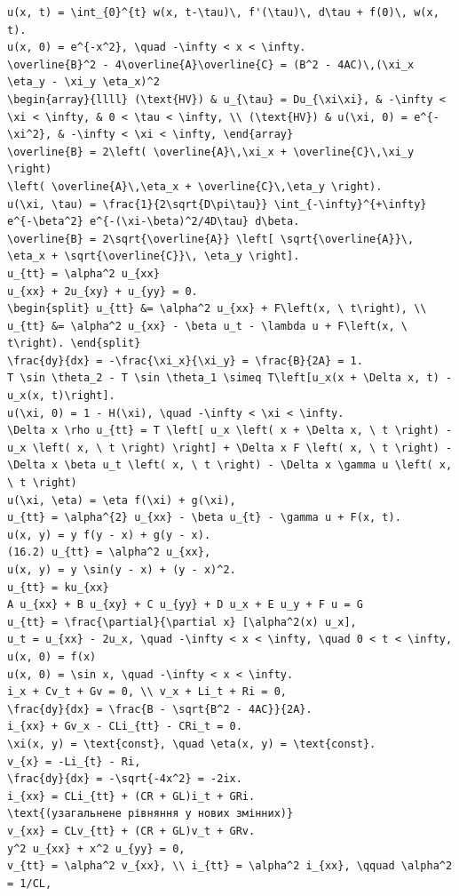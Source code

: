 \documentclass[
  ukrainian,
]{article}
\begin{document}
\begin{verbatim}
u(x, t) = \int_{0}^{t} w(x, t-\tau)\, f'(\tau)\, d\tau + f(0)\, w(x, t).
u(x, 0) = e^{-x^2}, \quad -\infty < x < \infty.
\overline{B}^2 - 4\overline{A}\overline{C} = (B^2 - 4AC)\,(\xi_x \eta_y - \xi_y \eta_x)^2
\begin{array}{llll} (\text{HV}) & u_{\tau} = Du_{\xi\xi}, & -\infty < \xi < \infty, & 0 < \tau < \infty, \\ (\text{HV}) & u(\xi, 0) = e^{-\xi^2}, & -\infty < \xi < \infty, \end{array}
\overline{B} = 2\left( \overline{A}\,\xi_x + \overline{C}\,\xi_y \right)
\left( \overline{A}\,\eta_x + \overline{C}\,\eta_y \right).
u(\xi, \tau) = \frac{1}{2\sqrt{D\pi\tau}} \int_{-\infty}^{+\infty} e^{-\beta^2} e^{-(\xi-\beta)^2/4D\tau} d\beta.
\overline{B} = 2\sqrt{\overline{A}} \left[ \sqrt{\overline{A}}\, \eta_x + \sqrt{\overline{C}}\, \eta_y \right].
u_{tt} = \alpha^2 u_{xx}
u_{xx} + 2u_{xy} + u_{yy} = 0.
\begin{split} u_{tt} &= \alpha^2 u_{xx} + F\left(x, \ t\right), \\ u_{tt} &= \alpha^2 u_{xx} - \beta u_t - \lambda u + F\left(x, \ t\right). \end{split}
\frac{dy}{dx} = -\frac{\xi_x}{\xi_y} = \frac{B}{2A} = 1.
T \sin \theta_2 - T \sin \theta_1 \simeq T\left[u_x(x + \Delta x, t) - u_x(x, t)\right].
u(\xi, 0) = 1 - H(\xi), \quad -\infty < \xi < \infty.
\Delta x \rho u_{tt} = T \left[ u_x \left( x + \Delta x, \ t \right) - u_x \left( x, \ t \right) \right] + \Delta x F \left( x, \ t \right) - \Delta x \beta u_t \left( x, \ t \right) - \Delta x \gamma u \left( x, \ t \right)
u(\xi, \eta) = \eta f(\xi) + g(\xi),
u_{tt} = \alpha^{2} u_{xx} - \beta u_{t} - \gamma u + F(x, t).
u(x, y) = y f(y - x) + g(y - x).
(16.2) u_{tt} = \alpha^2 u_{xx},
u(x, y) = y \sin(y - x) + (y - x)^2.
u_{tt} = ku_{xx}
A u_{xx} + B u_{xy} + C u_{yy} + D u_x + E u_y + F u = G
u_{tt} = \frac{\partial}{\partial x} [\alpha^2(x) u_x],
u_t = u_{xx} - 2u_x, \quad -\infty < x < \infty, \quad 0 < t < \infty,
u(x, 0) = f(x)
u(x, 0) = \sin x, \quad -\infty < x < \infty.
i_x + Cv_t + Gv = 0, \\ v_x + Li_t + Ri = 0,
\frac{dy}{dx} = \frac{B - \sqrt{B^2 - 4AC}}{2A}.
i_{xx} + Gv_x - CLi_{tt} - CRi_t = 0.
\xi(x, y) = \text{const}, \quad \eta(x, y) = \text{const}.
v_{x} = -Li_{t} - Ri,
\frac{dy}{dx} = -\sqrt{-4x^2} = -2ix.
i_{xx} = CLi_{tt} + (CR + GL)i_t + GRi.
\text{(узагальнене рівняння у нових змінних)}
v_{xx} = CLv_{tt} + (CR + GL)v_t + GRv.
y^2 u_{xx} + x^2 u_{yy} = 0,
v_{tt} = \alpha^2 v_{xx}, \\ i_{tt} = \alpha^2 i_{xx}, \qquad \alpha^2 = 1/CL,

\end{verbatim}
\end{document}
